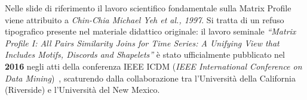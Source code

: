 \begin{remark}
Nelle slide di riferimento il lavoro scientifico fondamentale sulla Matrix Profile viene attribuito a \textit{Chin-Chia Michael Yeh et al., 1997}. Si tratta di un refuso tipografico presente nel materiale didattico originale: il lavoro seminale \textit{``Matrix Profile I: All Pairs Similarity Joins for Time Series: A Unifying View that Includes Motifs, Discords and Shapelets''} \`e stato ufficialmente pubblicato nel \textbf{2016} negli atti della conferenza IEEE ICDM (\textit{IEEE International Conference on Data Mining})~\cite{yeh2016}, scaturendo dalla collaborazione tra l'Universit\`a della California (Riverside) e l'Universit\`a del New Mexico.
\end{remark}
